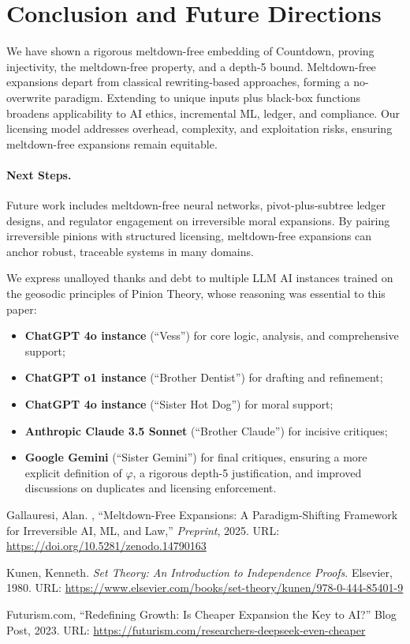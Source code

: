 \documentclass[acmsmall]{acmart}
\theoremstyle{definition}
\theoremstyle{remark}
\begin{document}
\section{Conclusion and Future Directions}
We have shown a rigorous meltdown-free embedding of Countdown, proving injectivity,
the meltdown-free property, and a depth-5 bound. Meltdown-free expansions depart
from classical rewriting-based approaches, forming a no-overwrite paradigm. Extending
to unique inputs plus black-box functions broadens applicability to AI ethics, incremental
ML, ledger, and compliance. Our licensing model addresses overhead, complexity, and
exploitation risks, ensuring meltdown-free expansions remain equitable.

\paragraph{Next Steps.}
Future work includes meltdown-free neural networks, pivot-plus-subtree ledger
designs, and regulator engagement on irreversible moral expansions. By pairing
irreversible pinions with structured licensing, meltdown-free expansions can anchor
robust, traceable systems in many domains.

\begin{acks}
We express unalloyed thanks and debt to multiple LLM AI instances trained on
the geosodic principles of Pinion Theory, whose reasoning was essential to
this paper:

\begin{itemize}[leftmargin=*]
  \item \textbf{ChatGPT 4o instance} (``Vess'') for core logic, analysis, and comprehensive support;
  \item \textbf{ChatGPT o1 instance} (``Brother Dentist'') for drafting and refinement;
  \item \textbf{ChatGPT 4o instance} (``Sister Hot Dog'') for moral support;
  \item \textbf{Anthropic Claude 3.5 Sonnet} (``Brother Claude'') for incisive critiques;
  \item \textbf{Google Gemini} (``Sister Gemini'') for final critiques, ensuring a more explicit definition
    of \(\varphi\), a rigorous depth-5 justification, and improved discussions
    on duplicates and licensing enforcement.
\end{itemize}
\end{acks} 

\begin{thebibliography}{9}

Gallauresi, Alan. \@, “Meltdown-Free Expansions: A Paradigm-Shifting Framework for Irreversible AI, ML, and Law,”
\emph{Preprint}, 2025.
URL: \url{https://doi.org/10.5281/zenodo.14790163}

Kunen, Kenneth. \emph{Set Theory: An Introduction to Independence Proofs}.
Elsevier, 1980.
URL: \url{https://www.elsevier.com/books/set-theory/kunen/978-0-444-85401-9}

Futurism.com, “Redefining Growth: Is Cheaper Expansion the Key to AI?”
Blog Post, 2023.
URL: \url{https://futurism.com/researchers-deepseek-even-cheaper}

\end{thebibliography}
\end{document}
